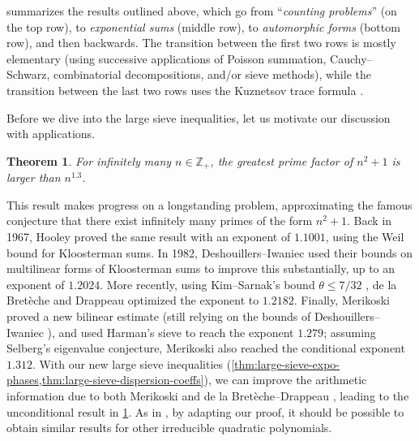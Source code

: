 \documentclass[reqno,11pt]{amsart}
\newtheorem{theorem}{Theorem}%
\theoremstyle{remark}
\numberwithin{equation}{section}
\newcommand{\Z}{\mathbb{Z}}
\begin{document}
 summarizes the results outlined above, which go from ``\emph{counting problems}'' (on the top row), to \emph{exponential sums} (middle row), to \emph{automorphic forms} (bottom row), and then backwards. The transition between the first two rows is mostly elementary (using successive applications of Poisson summation, Cauchy--Schwarz, combinatorial decompositions, and/or sieve methods), while the transition between the last two rows uses the Kuznetsov trace formula \cite{kuznetsov1980petersson,deshouillers1982kloosterman}.

Before we dive into the large sieve inequalities, let us motivate our discussion with applications.

\begin{theorem}\label{thm:appl-greatest-prime}
    For infinitely many $n \in \Z_+$, the greatest prime factor of $n^2+1$ is larger than $n^{1.3}$.
\end{theorem}

This result makes progress on a longstanding problem, approximating the famous conjecture that there exist infinitely many primes of the form $n^2+1$. Back in 1967, Hooley \cite{hooley1967greatest} proved the same result with an exponent of $1.1001$, using the Weil bound for Kloosterman sums. In 1982, Deshouillers--Iwaniec \cite{deshouillers1982greatest} used their bounds on multilinear forms of Kloosterman sums \cite{deshouillers1982kloosterman} to improve this substantially, up to an exponent of $1.2024$. More recently, using Kim--Sarnak's bound $\theta \le 7/32$ \cite[Appendix 2]{kim2003functoriality}, de la Bret\`eche and Drappeau optimized the exponent to $1.2182$. Finally, Merikoski \cite{merikoski2023largest} proved a new bilinear estimate (still relying on the bounds of Deshouillers--Iwaniec \cite{deshouillers1982kloosterman}), and used Harman's sieve to reach the exponent $1.279$; assuming Selberg's eigenvalue conjecture, Merikoski also reached the conditional exponent $1.312$. With our new large sieve inequalities (\cref{thm:large-sieve-expo-phases,thm:large-sieve-dispersion-coeffs}), we can improve the arithmetic information due to both Merikoski \cite{merikoski2023largest} and de la Bret\`eche--Drappeau \cite{de2020niveau}, leading to the unconditional result in \cref{thm:appl-greatest-prime}. As in \cite{merikoski2023largest,de2020niveau}, by
adapting our proof, it should be possible to obtain similar results for other irreducible quadratic polynomials.
\end{document}
